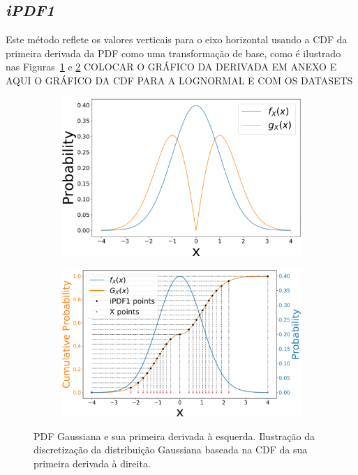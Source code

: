 \subsection{\textit{iPDF1}}

Este método reflete os valores verticais para o eixo horizontal usando a \ac{CDF} da primeira derivada da \ac{PDF} como uma transformação de base, como é ilustrado nas Figuras~\ref{fig:dPDF1} e \ref{fig:dPDF2}
{\color{red} COLOCAR O GRÁFICO DA DERIVADA EM ANEXO E AQUI O GRÁFICO DA CDF PARA A LOGNORMAL E COM OS DATASETS}
\begin{figure}[!ht]
	\centering
	\begin{subfigure}[b]{0.44\textwidth}
		\centering 
		\includegraphics[width=\textwidth]{./figuras/dpdf1}
		\caption{}
		\label{fig:dPDF1}
	\end{subfigure}
	\hfill
	\begin{subfigure}[b]{0.47\textwidth}
		\centering 
		\includegraphics[width=\textwidth]{./figuras/dpdf2}
		\caption{}
		\label{fig:dPDF2}
	\end{subfigure}
\caption{PDF Gaussiana e sua primeira derivada à esquerda. Ilustração da discretização da distribuição Gaussiana baseada na CDF da sua primeira derivada à direita.}
\label{fig:dPDF}
\end{figure}

